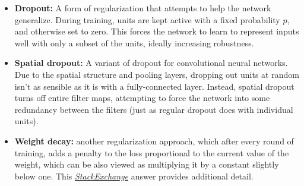 \begin{itemize}
    \begin{itemize} 
    \item \textbf{Dropout:\label{tg:dropout}} A form of regularization that attempts to help the network generalize. During training, units are kept active with a fixed probability $p$, and otherwise set to zero. This forces the network to learn to represent inputs well with only a subset of the units, ideally increasing robustness.
 
    \item \textbf{Spatial dropout:\label{tg:spatial-dropout}} A variant of dropout for convolutional neural networks. Due to the spatial structure and pooling layers, dropping out units at random isn't as sensible as it is with a fully-connected layer. Instead, spatial dropout turns off entire filter maps, attempting to force the network into some redundancy between the filters (just as regular dropout does with individual units).
 
    \item \textbf{Weight decay:\label{tg:weight-decay}} another regularization approach, which after every round of training, adds a penalty to the loss proportional to the current value of the weight, which can be also viewed as multiplying it by a constant slightly below one. This \href{https://stats.stackexchange.com/questions/29130/difference-between-neural-net-weight-decay-and-learning-rate}{\emph{StackExchange}} answer provides additional detail.
    \end{itemize}
\end{itemize}